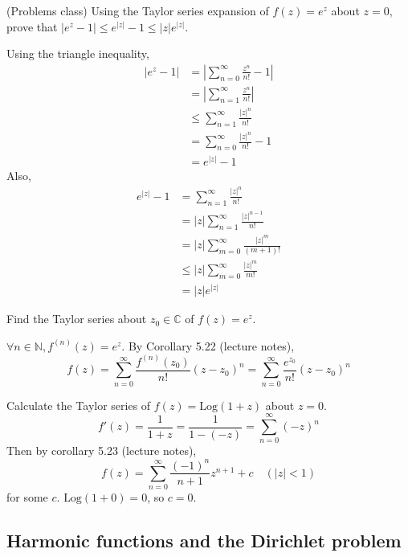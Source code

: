 \begin{example}
	(Problems class) Using the Taylor series expansion of $f(z) = e^z$ about $z = 0$, prove that $|e^z - 1| \le e^{|z|} - 1 \le |z| e^{|z|}$.

	Using the triangle inequality,
	\[
		\begin{aligned}
			|e^z - 1|
				& = \left| \sum_{n = 0}^{\infty} \frac{z^n}{n!} - 1 \right| \\
				& = \left| \sum_{n = 1}^{\infty} \frac{z^n}{n!} \right| \\
				& \le \sum_{n = 1}^{\infty} \frac{|z|^n}{n!} \\
				& = \sum_{n = 0}^{\infty} \frac{|z|^n}{n!} - 1 \\
				& = e^{|z|} - 1
		\end{aligned}
	\]
	Also,
	\[
		\begin{aligned}
			e^{|z|} - 1
				& = \sum_{n = 1}^{\infty} \frac{|z|^n}{n!} \\
				& = |z| \sum_{n = 1}^{\infty} \frac{|z|^{n - 1}}{n!} \\
				& = |z| \sum_{m = 0}^{\infty} \frac{|z|^m}{(m + 1)!} \\
				& \le |z| \sum_{m = 0}^{\infty} \frac{|z|^m}{m!} \\
				& = |z| e^{|z|}
		\end{aligned}
	\]
\end{example}

\begin{example}
	Find the Taylor series about $z_0 \in \mathbb{C}$ of $f(z) = e^z$.

	$\forall n \in \mathbb{N}, f^{(n)} (z) = e^z$. By Corollary 5.22 (lecture notes),
	\[
		f(z) = \sum_{n = 0}^{\infty} \frac{f^{(n)}(z_0)}{n!} {(z - z_0)}^n = \sum_{n = 0}^{\infty} \frac{e^{z_0}}{n!} {(z - z_0)}^n
	\]
\end{example}

\begin{example}
	Calculate the Taylor series of $f(z) = \text{Log}(1 + z)$ about $z = 0$.
	\[
		f'(z) = \frac{1}{1 + z} = \frac{1}{1 - (-z)} = \sum_{n = 0}^{\infty} {(-z)}^n
	\]
	Then by corollary 5.23 (lecture notes),
	\[
		f(z) = \sum_{n = 0}^{\infty} \frac{{(-1)}^n}{n + 1} z^{n + 1} + c \quad (|z| < 1)
	\]
	for some $c$. $\text{Log}(1 + 0) = 0$, so $c = 0$.
\end{example}

\subsection{Harmonic functions and the Dirichlet problem}

